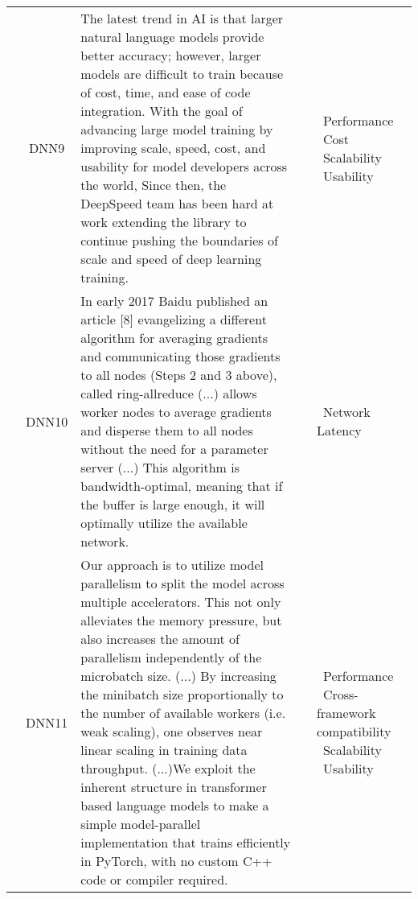 {\begin{longtable}{|l|c|p{11.8cm}|p{0.6cm}|p{2cm}|}
         & DNN9 & The latest trend in AI is that larger natural language models provide better accuracy; however, larger models are difficult to train because of cost, time, and ease of code integration. With the goal of advancing large model training by improving scale, speed, cost, and usability for model developers across the world, Since then, the DeepSpeed team has been hard at work extending the library to continue pushing the boundaries of scale and speed of deep learning training.
         & \cite{rasley_deepspeed_2020,huang_gpipe_2019,shoeybi_megatron-lm_2020}
	     & \textbullet\ Performance \newline \textbullet\ Cost \newline \textbullet\ Scalability \newline \textbullet\ Usability \\ \cline{2-5}

         & DNN10 & In early 2017 Baidu published an article [8] evangelizing a different algorithm for averaging gradients and communicating those gradients to all nodes (Steps 2 and 3 above), called ring-allreduce (...) allows worker nodes to average gradients and disperse them to all nodes without the need for a parameter server (...)  This algorithm is bandwidth-optimal, meaning that if the buffer is large enough, it will optimally utilize the available network.
         & \cite{sergeev_horovod_2018,li_colossal-ai_2023}
	     & \textbullet\ Network Latency \\ \cline{2-5}

         & DNN11 & Our approach is to utilize model parallelism to split the model across multiple accelerators. This not only alleviates the memory pressure, but also increases the amount of parallelism independently of the microbatch size. (...) By increasing the minibatch size proportionally to the number of available workers (i.e. weak scaling), one observes near linear scaling in training data throughput. (...)We exploit the inherent structure in transformer based language models to make a simple model-parallel implementation that trains efficiently in PyTorch, with no custom C++ code or compiler required.
         & \cite{shoeybi_megatron-lm_2020,rasley_deepspeed_2020}
	     & \textbullet\ Performance \newline \textbullet\ Cross-framework compatibility \newline \textbullet\ Scalability \newline \textbullet\ Usability \\ \cline{2-5}
         

\end{longtable}}

